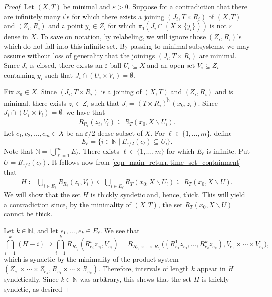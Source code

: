 \documentclass[letter,11pt]{article}
\theoremstyle{plain}
\theoremstyle{definition}
\theoremstyle{plain}
\theoremstyle{plain}
\numberwithin{equation}{section}
\newcommand{\eps}{\epsilon}
\newcommand{\N}{\mathbb{N}}
\renewcommand{\epsilon}{\varepsilon}
\renewcommand{\setminus}{\backslash}
\begin{document}
\begin{proof}
    Let $(X,T)$ be minimal and $\eps > 0$. Suppose for a contradiction that there are infinitely many $i$'s for which there exists a joining $(J_i, T \times R_i)$ of $(X,T)$ and $(Z_i,R_i)$ and a point $y_i \in Z_i$ for which $\pi_1(J_i \cap (X \times \{y_i\}))$ is not $\eps$ dense in $X$.   To save on notation, by relabeling, we will ignore those $(Z_i,R_i)$'s which do not fall into this infinite set. By passing to minimal subsystems, we may assume without loss of generality that the joinings $(J_i, T \times R_i)$ are minimal. Since $J_i$ is closed, there exists an $\eps$-ball $U_i \subseteq X$ and an open set $V_i \subseteq Z_i$ containing $y_i$ such that $J_i \cap (U_i \times V_i) = \emptyset$.

    Fix $x_0 \in X$.  Since $(J_i,T \times R_i)$ is a joining of $(X,T)$ and $(Z_i,R_i)$ and is minimal, there exists $z_i \in Z_i$ such that $J_i = \overline{(T \times R_i)^{\N}(x_0,z_i)}$. Since $J_i \cap (U_i \times V_i) = \emptyset$, we have that
    \begin{align}
    \label{eqn_main_return-time_set_containment}
        R_{R_i}(z_i,V_i) \subseteq R_T(x_0, X \setminus U_i).
    \end{align}
    Let $c_1, c_2, \ldots, c_m \in X$ be an $\eps/2$ dense subset of $X$.  For $\ell \in \{1, \ldots, m\}$, define
    \[
        E_\ell = \{i \in \N \ \big| \ B_{\eps/2}(c_\ell) \subseteq U_i \}.
    \]
    Note that $\N = \bigcup_{\ell=1}^m E_\ell$. 
    There exists $\ell \in \{1, \ldots, m\}$ for which $E_\ell$ is infinite.  Put $U = B_{\eps/2}(c_\ell)$. It follows now from \eqref{eqn_main_return-time_set_containment} that
    \begin{align}
    \label{eqn_main_return-time_set_containment_two}
        H \coloneqq \bigcup_{i \in E_\ell} R_{R_i}(z_i,V_i) \subseteq  \bigcup_{i \in E_\ell} R_T(x_0, X \setminus U_i) \subseteq R_T(x_0, X \setminus U).
    \end{align}
    We will show that the set $H$ is thickly syndetic and, hence, thick.  This will yield a contradiction since, by the minimality of $(X,T)$, the set $R_T(x_0, X \setminus U)$ cannot be thick.

    Let $k \in \N$, and let $e_1, \ldots, e_k \in E_\ell$. We see that
    \[\bigcap_{i=1}^k (H-i) \supseteq \bigcap_{i=1}^k R_{R_{e_i}}(R_{e_i}^{i}z_{e_i},V_{e_i}) = R_{R_{e_1} \times \cdots \times R_{e_k}}\big((R_{e_1}^1z_{e_1}, \ldots, R_{e_k}^{k}z_{e_k}),V_{e_1} \times \cdots \times V_{e_k}\big),\]
    which is syndetic by the minimality of the product system $(Z_{e_1} \times \cdots \times Z_{e_k},R_{e_1} \times \cdots \times R_{e_k})$. Therefore, intervals of length $k$ appear in $H$ syndetically. Since $k \in \N$ was arbitrary, this shows that the set $H$ is thickly syndetic, as desired.
\end{proof}
\end{document}
